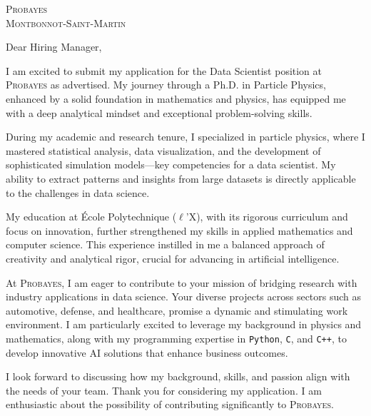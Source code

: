 \documentclass[11pt,a4paper]{lettre}
\begin{document}
\begin{letter} 
{\textsc{Probayes}  \\
\textsc{Montbonnot-Saint-Martin} }
\\
\address{M. \textsc{Benane} Gaya\\
171 Avenue de Luminy\\
Logement EF38\\
13~009~\textsc{Marseille}}  

\signature{ Gaya \textsc{Benane}}
\nofax
\date{\today}

{}
\opening{\hspace{1em} Dear Hiring Manager,}
\hspace{1em}
I am excited to submit my application for the Data Scientist position at \textsc{Probayes} as advertised. My journey through a Ph.D. in Particle Physics, enhanced by a solid foundation in mathematics and physics, has equipped me with a deep analytical mindset and exceptional problem-solving skills.

\hspace{1em}
During my academic and research tenure, I specialized in particle physics, where I mastered statistical analysis, data visualization, and the development of sophisticated simulation models—key competencies for a data scientist. My ability to extract patterns and insights from large datasets is directly applicable to the challenges in data science.

My education at École Polytechnique ($\ell$’X), with its rigorous curriculum and focus on innovation, further strengthened my skills in applied mathematics and computer science. This experience instilled in me a balanced approach of creativity and analytical rigor, crucial for advancing in artificial intelligence.

At \textsc{Probayes}, I am eager to contribute to your mission of bridging research with industry applications in data science. Your diverse projects across sectors such as automotive, defense, and healthcare, promise a dynamic and stimulating work environment. I am particularly excited to leverage my background in physics and mathematics, along with my programming expertise in \texttt{Python}, \texttt{C}, and \texttt{C++}, to develop innovative AI solutions that enhance business outcomes.

\closing{\hspace{1em}
I look forward to discussing how my background, skills, and passion align with the needs of your team. Thank you for considering my application. I am enthusiastic about the possibility of contributing significantly to \textsc{Probayes}.}
\end{letter}
\end{document}
